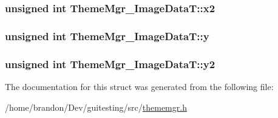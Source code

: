 \hypertarget{struct_theme_mgr___image_data_t_d850c8ebc01552ae58d1b2799f424c4d}{
\subsubsection[{x2}]{\setlength{\rightskip}{0pt plus 5cm}unsigned int {\bf ThemeMgr\_\-ImageDataT::x2}}}
\label{struct_theme_mgr___image_data_t_d850c8ebc01552ae58d1b2799f424c4d}


\hypertarget{struct_theme_mgr___image_data_t_e202cf2ccc682085965dd85e4e0aa1da}{
\subsubsection[{y}]{\setlength{\rightskip}{0pt plus 5cm}unsigned int {\bf ThemeMgr\_\-ImageDataT::y}}}
\label{struct_theme_mgr___image_data_t_e202cf2ccc682085965dd85e4e0aa1da}


\hypertarget{struct_theme_mgr___image_data_t_c6e97b3272a3769f14460771df93c14e}{
\subsubsection[{y2}]{\setlength{\rightskip}{0pt plus 5cm}unsigned int {\bf ThemeMgr\_\-ImageDataT::y2}}}
\label{struct_theme_mgr___image_data_t_c6e97b3272a3769f14460771df93c14e}




The documentation for this struct was generated from the following file:\begin{CompactItemize}
\item 
/home/brandon/Dev/guitesting/src/\hyperlink{thememgr_8h}{thememgr.h}\end{CompactItemize}
